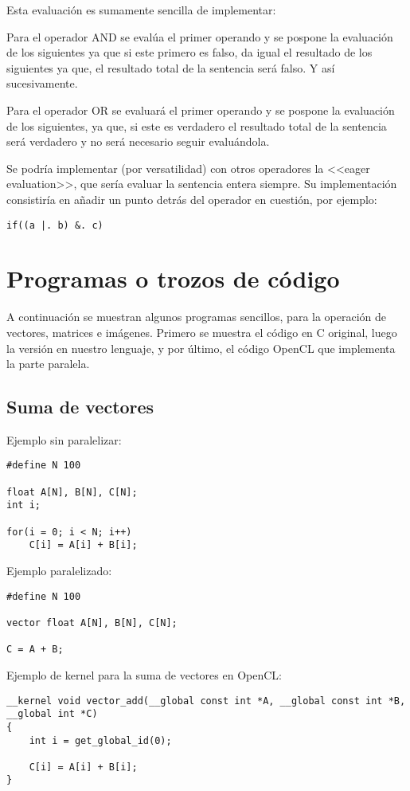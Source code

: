 \documentclass[12pt,a4paper]{article}
\begin{document}
Esta evaluación es sumamente sencilla de implementar:

Para el operador AND se evalúa el primer operando y se pospone la evaluación de 
los siguientes ya que si este primero es falso, da igual el resultado de los 
siguientes ya que, el resultado total de la sentencia será falso. Y así 
sucesivamente.

Para el operador OR se evaluará el primer operando y se pospone la evaluación 
de los siguientes, ya que, si este es verdadero el resultado total de la 
sentencia será verdadero y no será necesario seguir evaluándola.

Se podría implementar (por versatilidad) con otros operadores la <<eager 
evaluation>>, que sería evaluar la sentencia entera siempre. Su implementación 
consistiría en añadir un punto detrás del operador en cuestión, por ejemplo:

\begin{lstlisting}
if((a |. b) &. c)
\end{lstlisting}



\section{Programas o trozos de código}
A continuación se muestran algunos programas sencillos, para la operación de 
vectores, matrices e imágenes. Primero se muestra el código en C original, luego 
la versión en nuestro lenguaje, y por último, el código OpenCL que implementa la 
parte paralela.

\subsection{Suma de vectores}
Ejemplo sin paralelizar:
\begin{lstlisting}
#define N 100

float A[N], B[N], C[N];
int i;

for(i = 0; i < N; i++)
    C[i] = A[i] + B[i];
\end{lstlisting}

Ejemplo paralelizado:
\begin{lstlisting}
#define N 100

vector float A[N], B[N], C[N];

C = A + B;
\end{lstlisting}

Ejemplo de kernel para la suma de vectores en OpenCL:
\begin{lstlisting}
__kernel void vector_add(__global const int *A, __global const int *B, __global int *C)
{ 
    int i = get_global_id(0);
 
    C[i] = A[i] + B[i];
}
\end{lstlisting}
\end{document}
